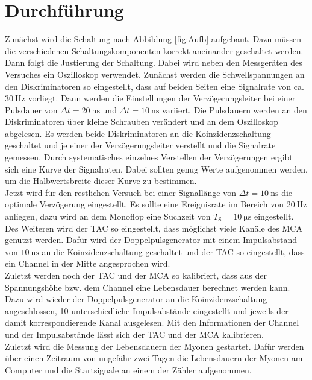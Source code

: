 \section{Durchführung}
	
	Zunächst wird die Schaltung nach Abbildung \ref{fig:Aufb} aufgebaut. 
    Dazu müssen die verschiedenen Schaltungskomponenten korrekt aneinander geschaltet werden.\\
	Dann folgt die Justierung der Schaltung. Dabei wird neben den Messgeräten des Versuches ein Oszilloskop verwendet.
	Zunächst werden die Schwellspannungen an den Diskriminatoren so eingestellt, dass auf beiden Seiten eine Signalrate von ca. $\SI{30}{\hertz}$ vorliegt. 
    Dann werden die Einstellungen der Verzögerungsleiter bei einer Pulsdauer von $\Delta t= \SI{20}{\nano\second}$ und $\Delta t= \SI{10}{\nano\second}$ variiert.
	Die Pulsdauern werden an den Diskriminatoren über kleine Schrauben verändert und an dem Oszilloskop abgelesen.
	Es werden beide Diskriminatoren an die Koinzidenzschaltung geschaltet und je einer der Verzögerungsleiter verstellt und die Signalrate gemessen.
	Durch systematisches einzelnes Verstellen der Verzögerungen ergibt sich eine Kurve der Signalraten. 
    Dabei sollten genug Werte aufgenommen werden, um die Halbwertsbreite dieser Kurve zu bestimmen.\\
	Jetzt wird für den restlichen Versuch bei einer Signallänge von $\Delta t= \SI{10}{\nano\second}$ die optimale Verzögerung eingestellt.
    Es sollte eine Ereignisrate im Bereich von $\SI{20}{\hertz}$ anliegen, dazu wird an dem Monoflop eine Suchzeit von $T_\text{S} = \SI{10}{\micro\second}$ eingestellt.\\
	Des Weiteren wird der TAC so eingestellt, dass möglichst viele Kanäle des MCA genutzt werden.
	Dafür wird der Doppelpulsgenerator mit einem Impulsabstand von $\SI{10}{\nano\second}$ an die Koinzidenzschaltung geschaltet und der TAC so eingestellt, dass ein Channel in der Mitte angesprochen wird.\\
	Zuletzt werden noch der TAC und der MCA so kalibriert, dass aus der Spannungshöhe bzw. dem Channel eine Lebensdauer berechnet werden kann.
	Dazu wird wieder der Doppelpulsgenerator an die Koinzidenzschaltung angeschlossen, 10 unterschiedliche Impulsabstände eingestellt und jeweils der damit korrespondierende Kanal ausgelesen.
	Mit den Informationen der Channel und der Impulsabstände lässt sich der TAC und der MCA kalibrieren.\\
    Zuletzt wird die Messung der Lebensdauern der Myonen gestartet. 
    Dafür werden über einen Zeitraum von ungefähr zwei Tagen die Lebensdauern der Myonen am Computer und die Startsignale an einem der Zähler aufgenommen.
